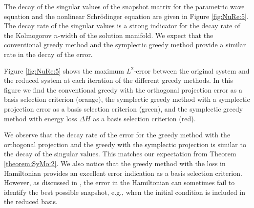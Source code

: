 The decay of the singular values of the snapshot matrix for the parametric wave equation and the nonlinear Schr\"odinger equation are given in Figure \ref{fig:NuRe:5}. The decay rate of the singular values is a strong indicator for the decay rate of the Kolmogorov $n$-width of the solution manifold. We expect that the conventional greedy method and the symplectic greedy method provide a similar rate in the decay of the error.
	
Figure \ref{fig:NuRe:5} shows the maximum $L^2$-error between the original system and the reduced system at each iteration of the different greedy methods. In this figure we find the conventional greedy with the orthogonal projection error as a basis selection criterion (orange), the symplectic greedy method with a symplectic projection error as a basis selection criterion (green), and the symplectic greedy method with energy loss $\Delta H$ as a basis selection criterion (red).

We observe that the decay rate of the error for the greedy method with the orthogonal projection and the greedy with the symplectic projection is similar to the decay of the singular values. This matches our expectation from Theorem \ref{theorem:SyMo:2}. We also notice that the greedy method with the loss in Hamiltonian provides an excellent error indication as a basis selection criterion. However, as discussed in , the error in the Hamiltonian can sometimes fail to identify the best possible snapshot, e.g., when the initial condition is included in the reduced basis.


